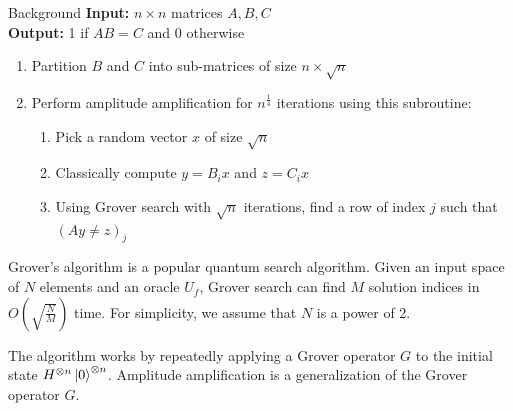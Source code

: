 \documentclass[final]{beamer}
\newlength{\colwidth}
\begin{document}
\begin{frame}[t]
\begin{columns}[t]
\begin{column}{\colwidth}
\begin{block}{Background}
    \textbf{Input: } $n \times n$ matrices $A, B, C$ \\
    \textbf{Output: } 1 if $AB = C$ and 0 otherwise \\
    \begin{enumerate}
      \item Partition $B$ and $C$ into sub-matrices of size $n \times \sqrt{n}$
      \item 
        {
          Perform amplitude amplification for $n^{\frac{1}{4}}$ iterations using this subroutine:
          \begin{enumerate}
            \item Pick a random vector $x$ of size $\sqrt{n}$
            \item Classically compute $y = B_ix$ and $z = C_ix$
            \item Using Grover search with $\sqrt{n}$ iterations, find a row of
              index $j$ such that $(Ay \neq z)_j$
          \end{enumerate}
        }
    \end{enumerate}

    Grover’s algorithm is a popular quantum search algorithm. Given an input
    space of $N$ elements and an oracle $U_f$, Grover search can find $M$
    solution indices in $O(\sqrt{\frac{N}{M}})$ time. For simplicity, we assume
    that $N$ is a power of 2. 

    The algorithm works by repeatedly applying a Grover operator $G$ to the
    initial state $H^{\otimes n}\ket{0}^{\otimes n }$. Amplitude amplification is a generalization of the Grover operator $G$.

    \end{block}



\end{column}
\end{columns}
\end{frame}
\end{document}
